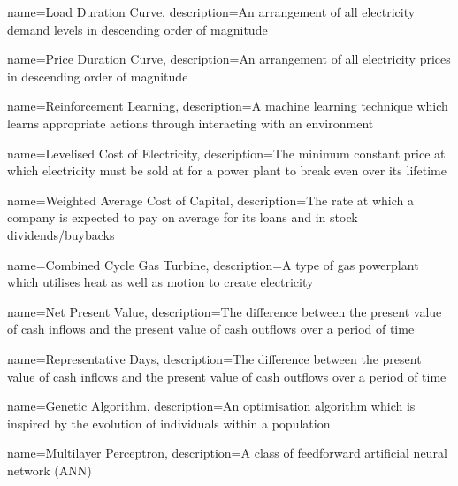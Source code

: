 {
	name=Load Duration Curve,
	description={An arrangement of all electricity demand levels in descending order of magnitude}
}




{
	name=Price Duration Curve,
	description={An arrangement of all electricity prices in descending order of magnitude}
}


{
	name=Reinforcement Learning,
	description={A machine learning technique which learns appropriate actions through interacting with an environment}
}



{
	name=Levelised Cost of Electricity,
	description={The minimum constant price at which electricity must be sold at for a power plant to break even over its lifetime}
}



{
	name=Weighted Average Cost of Capital,
	description={The rate at which a company is expected to pay on average for its loans and in stock dividends/buybacks}
}


{
	name=Combined Cycle Gas Turbine,
	description={A type of gas powerplant which utilises heat as well as motion to create electricity}
}



{
	name=Net Present Value,
	description={The difference between the present value of cash inflows and the present value of cash outflows over a period of time}
}


{
	name=Representative Days,
	description={The difference between the present value of cash inflows and the present value of cash outflows over a period of time}
}


{
	name=Genetic Algorithm,
	description={An optimisation algorithm which is inspired by the evolution of individuals within a population}
}



{
	name=Multilayer Perceptron,
	description={A class of feedforward artificial neural network (ANN)}
}








